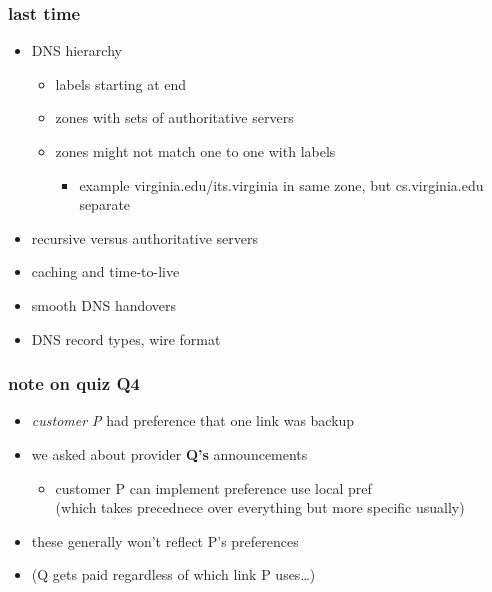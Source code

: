 \date{}
\title{}
\date{}

\begin{frame}
    \titlepage
\end{frame}



\begin{frame}
\frametitle{last time}
    \begin{itemize}
        \item DNS hierarchy
            \begin{itemize}
            \item labels starting at end
            \item zones with sets of authoritative servers
            \item zones might not match one to one with labels
                \begin{itemize}
                \item example virginia.edu/its.virginia in same zone, but cs.virginia.edu separate
                \end{itemize}
            \end{itemize}
        \item recursive versus authoritative servers
        \item caching and time-to-live
        \item smooth DNS handovers
        \item DNS record types, wire format
    \end{itemize}
\end{frame}

\begin{frame}
\frametitle{note on quiz Q4}
    \begin{itemize}
        \item \textit{customer P} had preference that one link was backup
        \item we asked about provider \textbf{Q's} announcements
            \begin{itemize}
                \item customer P can implement preference use local pref \\
                    (which takes precednece over everything but more specific usually)
            \end{itemize}
        \item these generally won't reflect P's preferences
            \vspace{.5cm}
        \item (Q gets paid regardless of which link P uses\ldots)
    \end{itemize}
\end{frame}


